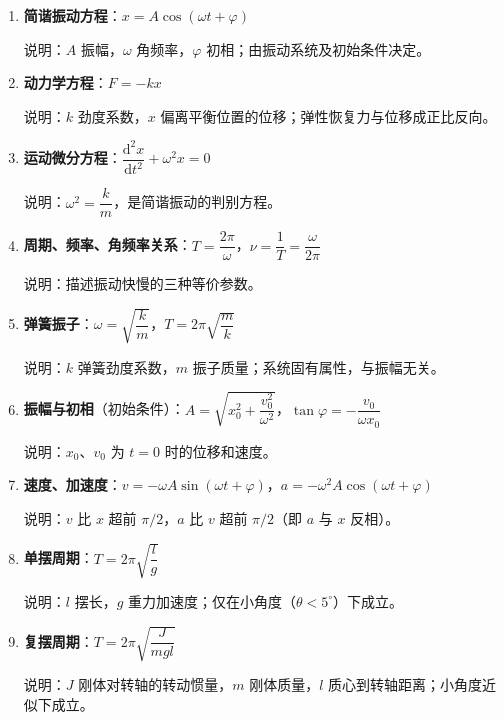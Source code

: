 \documentclass[12pt,a4paper]{ctexart}
\begin{document}
\begin{enumerate}[leftmargin=3em,label=\textbf{公式\arabic*}：,ref=公式\arabic*]

    \item \textbf{简谐振动方程}：$x=A\cos(\omega t+\varphi)$

    说明：$A$ 振幅，$\omega$ 角频率，$\varphi$ 初相；由振动系统及初始条件决定。

    \item \textbf{动力学方程}：$F=-kx$

    说明：$k$ 劲度系数，$x$ 偏离平衡位置的位移；弹性恢复力与位移成正比反向。

    \item \textbf{运动微分方程}：$\dfrac{\mathrm{d}^2x}{\mathrm{d}t^2}+\omega^2 x=0$

    说明：$\omega^2=\dfrac{k}{m}$，是简谐振动的判别方程。

    \item \textbf{周期、频率、角频率关系}：$T=\dfrac{2\pi}{\omega}$，$\nu=\dfrac{1}{T}=\dfrac{\omega}{2\pi}$

    说明：描述振动快慢的三种等价参数。

    \item \textbf{弹簧振子}：$\omega=\sqrt{\dfrac{k}{m}}$，$T=2\pi\sqrt{\dfrac{m}{k}}$

    说明：$k$ 弹簧劲度系数，$m$ 振子质量；系统固有属性，与振幅无关。

    \item \textbf{振幅与初相}（初始条件）：$A=\sqrt{x_0^2+\dfrac{v_0^2}{\omega^2}}$，$\tan\varphi=-\dfrac{v_0}{\omega x_0}$

    说明：$x_0$、$v_0$ 为 $t=0$ 时的位移和速度。

    \item \textbf{速度、加速度}：$v=-\omega A\sin(\omega t+\varphi)$，$a=-\omega^2 A\cos(\omega t+\varphi)$

    说明：$v$ 比 $x$ 超前 $\pi/2$，$a$ 比 $v$ 超前 $\pi/2$（即 $a$ 与 $x$ 反相）。

    \item \textbf{单摆周期}：$T=2\pi\sqrt{\dfrac{l}{g}}$

    说明：$l$ 摆长，$g$ 重力加速度；仅在小角度（$\theta<5^\circ$）下成立。

    \item \textbf{复摆周期}：$T=2\pi\sqrt{\dfrac{J}{mgl}}$

    说明：$J$ 刚体对转轴的转动惯量，$m$ 刚体质量，$l$ 质心到转轴距离；小角度近似下成立。


\end{enumerate}
\end{document}
